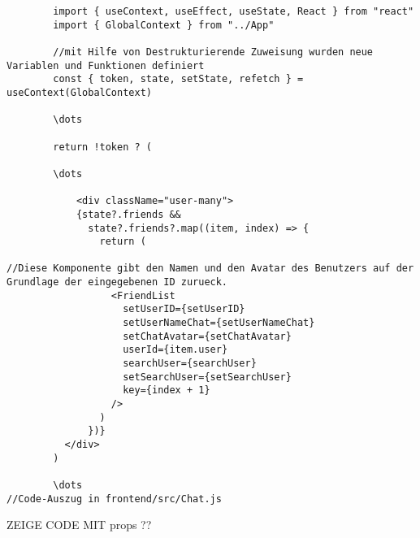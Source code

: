    \begin{lstlisting}
        import { useContext, useEffect, useState, React } from "react"
        import { GlobalContext } from "../App"
        
        //mit Hilfe von Destrukturierende Zuweisung wurden neue Variablen und Funktionen definiert
        const { token, state, setState, refetch } = useContext(GlobalContext)

        \dots

        return !token ? (

        \dots

            <div className="user-many">
            {state?.friends &&
              state?.friends?.map((item, index) => {
                return (

//Diese Komponente gibt den Namen und den Avatar des Benutzers auf der Grundlage der eingegebenen ID zurueck.
                  <FriendList
                    setUserID={setUserID}
                    setUserNameChat={setUserNameChat}
                    setChatAvatar={setChatAvatar}
                    userId={item.user}
                    searchUser={searchUser}
                    setSearchUser={setSearchUser}
                    key={index + 1}
                  />
                )
              })}
          </div>
        )

        \dots
//Code-Auszug in frontend/src/Chat.js

    \end{lstlisting}

ZEIGE CODE MIT props ??




